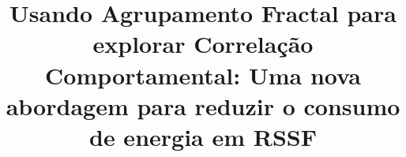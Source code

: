 \documentclass{acm_proc_article-sp}
\begin{document}
\title{Usando Agrupamento Fractal para explorar Correlação Comportamental: Uma nova
abordagem para reduzir o consumo de energia em RSSF}





\maketitle
\end{document}
